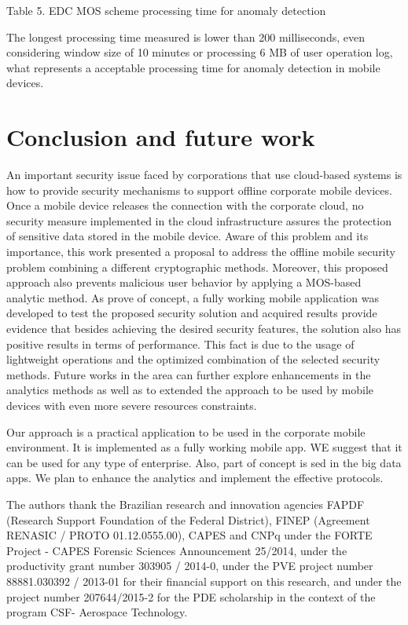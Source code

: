 \documentclass[twocolumn]{svjour3}          %
\begin{document}
Table 5. EDC MOS scheme processing time for anomaly detection 

The longest processing time measured is lower than 200 milliseconds, even considering window size of 10 minutes or processing 6 MB of user operation log, what represents a acceptable processing time for anomaly detection in mobile devices.

\section{Conclusion and future work }
\label{sec_conclusion}
An important security issue faced by corporations that use cloud-based systems is how to provide security mechanisms to support offline corporate mobile devices. Once a mobile device releases the connection with the corporate cloud, no security measure implemented in the cloud infrastructure assures the protection of sensitive data stored in the mobile device. Aware of this problem and its importance, this work presented a proposal to address the offline mobile security problem combining a different cryptographic methods. Moreover, this proposed approach also prevents malicious user behavior by applying a MOS-based analytic method. As prove of concept, a fully working mobile application was developed to test the proposed security solution and acquired results provide evidence that besides achieving the desired security features, the solution also has positive results in terms of performance. This fact is due to the usage of lightweight operations and the optimized combination of the selected security methods. 
Future works in the area can further explore enhancements in the analytics methods as well as to extended the approach to be used by mobile devices with even more severe resources constraints.   

Our approach is a practical application to be used in the corporate mobile environment. It is implemented as a fully working mobile app. WE suggest that it can be used for any type of enterprise. Also, part of concept is sed in the big data apps. We plan to enhance the analytics and implement the effective protocols.

\begin{acknowledgements}
The authors thank the Brazilian research and innovation agencies FAPDF (Research Support Foundation of the Federal District), FINEP (Agreement RENASIC / PROTO 01.12.0555.00), CAPES and CNPq under the FORTE Project - CAPES Forensic Sciences Announcement 25/2014, under the productivity grant number 303905 / 2014-0, under the PVE project number 88881.030392 / 2013-01 for their financial support on this research, and under the project number 207644/2015-2 for the PDE scholarship in the context of the program CSF- Aerospace Technology.\end{acknowledgements}

\end{document}
